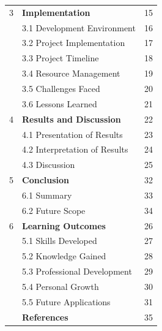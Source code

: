 \begin{center}
  \renewcommand{\arraystretch}{1.5} %
  \begin{tabular}{p{2cm} p{10cm} p{2cm}}
    

3 & \textbf{Implementation} & 15 \\
  & 3.1 Development Environment & 16 \\
  & 3.2 Project Implementation & 17 \\
  & 3.3 Project Timeline & 18 \\
  & 3.4 Resource Management & 19 \\
  & 3.5 Challenges Faced & 20 \\
  & 3.6 Lessons Learned & 21 \\

4 & \textbf{Results and Discussion} & 22 \\
  & 4.1 Presentation of Results & 23 \\
  & 4.2 Interpretation of Results & 24 \\
  & 4.3 Discussion & 25 \\

  5 & \textbf{Conclusion} & 32 \\
    & 6.1 Summary & 33 \\
    & 6.2 Future Scope & 34 \\
    
6 & \textbf{Learning Outcomes} & 26 \\
  & 5.1 Skills Developed & 27 \\
  & 5.2 Knowledge Gained & 28 \\
  & 5.3 Professional Development & 29 \\
  & 5.4 Personal Growth & 30 \\
  & 5.5 Future Applications & 31 \\

  & \textbf{References} & 35 \\
  \end{tabular}
\end{center}